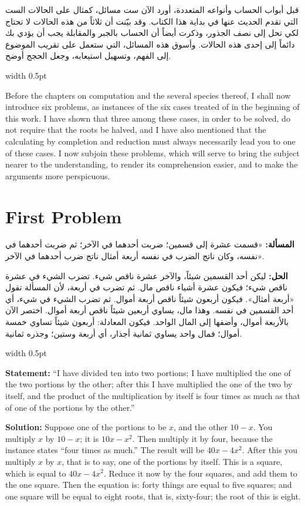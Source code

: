 \documentclass[10pt,a4paper]{book}
\newlength{\colwidth}
\newcommand{\bilingualpair}[2]{%
  \noindent
  \begin{minipage}[t]{\colwidth}
  \begin{flushright}
  \vspace{0pt}
  {\arabicfont\small #1}
  \end{flushright}
  \end{minipage}%
  \hfill\textcolor{columnsepclr}{\vrule width 0.5pt}\hfill
  \begin{minipage}[t]{\colwidth}
  \vspace{0pt}
  {\small #2}
  \end{minipage}%
  \par\vspace{0.6em}
}
\begin{document}
\bilingualpair{
قبل أبواب الحساب وأنواعه المتعددة، أورد الآن ست مسائل،
كمثال على الحالات الست التي تقدم الحديث عنها في بداية هذا
الكتاب. وقد بيّنت أن ثلاثاً من هذه الحالات لا تحتاج لكي تحل
إلى نصف الجذور، وذكرت أيضاً أن الحساب بالجبر والمقابلة يجب
أن يؤدي بك دائماً إلى إحدى هذه الحالات. وأسوق هذه المسائل،
التي ستعمل على تقريب الموضوع إلى الفهم، وتسهيل استيعابه،
وجعل الحجج أوضح.
}{
Before the chapters on computation and the several species thereof, I shall
now introduce six problems, as instances of the six cases treated of in the
beginning of this work. I have shown that three among these cases, in order
to be solved, do not require that the roots be halved, and I have also
mentioned that the calculating by completion and reduction must always
necessarily lead you to one of these cases. I now subjoin these problems,
which will serve to bring the subject nearer to the understanding, to render
its comprehension easier, and to make the arguments more perspicuous.
}

\section*{First Problem}

\bilingualpair{
\textbf{المسألة:} «قسمت عشرة إلى قسمين؛ ضربت أحدهما في
الآخر؛ ثم ضربت أحدهما في نفسه، وكان ناتج الضرب في نفسه
أربعة أمثال ناتج ضرب أحدهما في الآخر».

\textbf{الحل:} ليكن أحد القسمين شيئاً، والآخر عشرة ناقص شيء.
تضرب الشيء في عشرة ناقص شيء؛ فيكون عشرة أشياء ناقص مال.
ثم تضرب في أربعة، لأن المسألة تقول «أربعة أمثال». فيكون
أربعون شيئاً ناقص أربعة أموال. ثم تضرب الشيء في شيء، أي
أحد القسمين في نفسه. وهذا مال، يساوي أربعين شيئاً ناقص
أربعة أموال. اختصر الآن بالأربعة أموال، وأضفها إلى المال
الواحد. فيكون المعادلة: أربعون شيئاً تساوي خمسة أموال؛ فمال
واحد يساوي ثمانية أجذار، أي أربعة وستين؛ وجذره ثمانية.
}{
\textbf{Statement:} ``I have divided ten into two portions; I have multiplied
the one of the two portions by the other; after this I have multiplied the
one of the two by itself, and the product of the multiplication by itself is
four times as much as that of one of the portions by the other.''

\textbf{Solution:} Suppose one of the portions to be $x$, and the other $10 - x$.
You multiply $x$ by $10 - x$; it is $10x - x^2$. Then multiply it by four,
because the instance states ``four times as much.'' The result will be $40x -
4x^2$. After this you multiply $x$ by $x$, that is to say, one of the
portions by itself. This is a square, which is equal to $40x - 4x^2$.
Reduce it now by the four squares, and add them to the one square. Then the
equation is: forty things are equal to five squares; and one square will be
equal to eight roots, that is, sixty-four; the root of this is eight.
}
\end{document}
